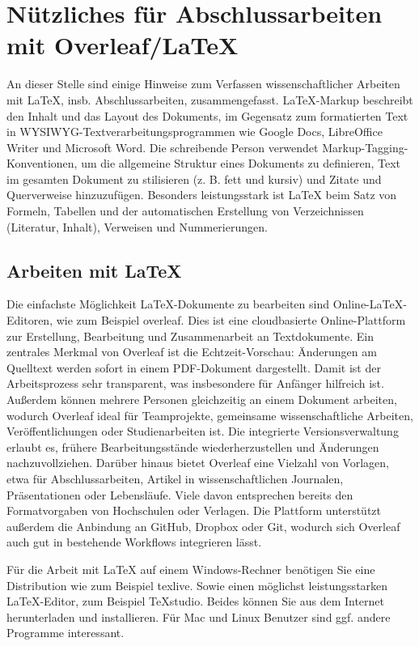 \chapter{Nützliches für Abschlussarbeiten mit Overleaf/LaTeX}
\label{ch:latex}

An dieser Stelle sind einige Hinweise zum Verfassen wissenschaftlicher Arbeiten mit LaTeX, insb. Abschlussarbeiten, zusammengefasst. LaTeX-Markup beschreibt den Inhalt und das Layout des Dokuments, im Gegensatz zum formatierten Text in WYSIWYG-Textverarbeitungsprogrammen wie Google Docs, LibreOffice Writer und Microsoft Word. Die schreibende Person verwendet Markup-Tagging-Konventionen, um die allgemeine Struktur eines Dokuments zu definieren, Text im gesamten Dokument zu stilisieren (z. B. fett und kursiv) und Zitate und Querverweise hinzuzufügen. Besonders leistungsstark ist LaTeX beim Satz von Formeln, Tabellen und der automatischen Erstellung von Verzeichnissen (Literatur, Inhalt), Verweisen und Nummerierungen.

\section{Arbeiten mit LaTeX}
\label{sec:latex}
Die einfachste Möglichkeit LaTeX-Dokumente zu bearbeiten sind Online-LaTeX-Editoren, wie zum Beispiel overleaf. Dies ist eine cloudbasierte Online-Plattform zur Erstellung, Bearbeitung und Zusammenarbeit an Textdokumente. Ein zentrales Merkmal von Overleaf ist die Echtzeit-Vorschau: Änderungen am Quelltext werden sofort in einem PDF-Dokument dargestellt. Damit ist der Arbeitsprozess sehr transparent, was insbesondere für Anfänger hilfreich ist. Außerdem können mehrere Personen gleichzeitig an einem Dokument arbeiten, wodurch Overleaf ideal für Teamprojekte, gemeinsame wissenschaftliche Arbeiten, Veröffentlichungen oder Studienarbeiten ist. Die integrierte Versionsverwaltung erlaubt es, frühere Bearbeitungsstände wiederherzustellen und Änderungen nachzuvollziehen. Darüber hinaus bietet Overleaf eine Vielzahl von Vorlagen, etwa für Abschlussarbeiten, Artikel in wissenschaftlichen Journalen, Präsentationen oder Lebensläufe. Viele davon entsprechen bereits den Formatvorgaben von Hochschulen oder Verlagen. Die Plattform unterstützt außerdem die Anbindung an GitHub, Dropbox oder Git, wodurch sich Overleaf auch gut in bestehende Workflows integrieren lässt.

Für die Arbeit mit LaTeX auf einem Windows-Rechner benötigen Sie eine Distribution wie zum Beispiel texlive. Sowie einen möglichst leistungsstarken LaTeX-Editor, zum Beispiel TeXstudio. Beides können Sie aus dem Internet herunterladen und installieren. Für Mac und Linux Benutzer sind ggf. andere Programme interessant.

